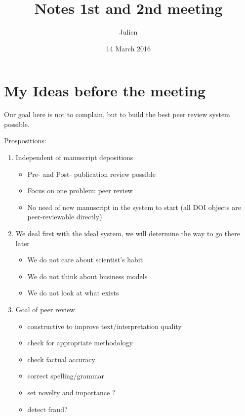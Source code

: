 \documentclass[]{article}
\title{Notes 1st and 2nd meeting}
\author{Julien}
\date{14 March 2016}
\begin{document}
\maketitle


{
\hypersetup{linkcolor=black}
\setcounter{tocdepth}{2}
\tableofcontents
}
\section{My Ideas before the meeting}\label{my-ideas-before-the-meeting}

Our goal here is not to complain, but to build the best peer review
system possible.

Prospositions:

\begin{enumerate}
\def\labelenumi{\arabic{enumi}.}
\itemsep1pt\parskip0pt
\item
  Independent of manuscript depositions

  \begin{itemize}
  \itemsep1pt\parskip0pt
  \item
    Pre- and Post- publication review possible
  \item
    Focus on one problem: peer review
  \item
    No need of new manuscript in the system to start (all DOI objects
    are peer-reviewable directly)
  \end{itemize}
\item
  We deal first with the ideal system, we will determine the way to go
  there later

  \begin{itemize}
  \itemsep1pt\parskip0pt
  \item
    We do not care about scientist's habit
  \item
    We do not think about business models
  \item
    We do not look at what exists
  \end{itemize}
\item
  Goal of peer review

  \begin{itemize}
  \itemsep1pt\parskip0pt
  \item
    constructive to improve text/interpretation quality
  \item
    check for appropriate methodology
  \item
    check factual accuracy
  \item
    correct spelling/grammar
  \item
    set novelty and importance ?
  \item
    detect fraud?
  \end{itemize}
\end{enumerate}
\end{document}
